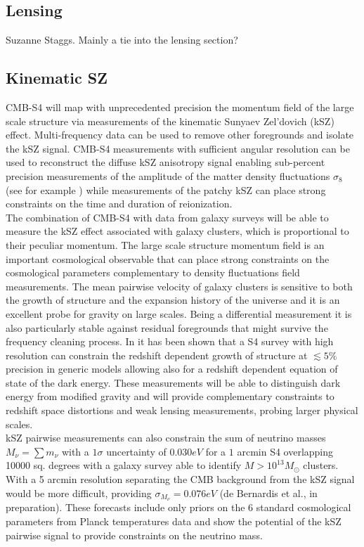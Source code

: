 \subsection{Lensing}

Suzanne Staggs.   Mainly a tie into the lensing section?

\subsection{Kinematic SZ}

CMB-S4 will map with unprecedented precision the momentum field of the large scale structure via measurements of the kinematic Sunyaev Zel'dovich (kSZ) effect. Multi-frequency data can be used to remove other foregrounds and isolate the kSZ signal. CMB-S4 measurements with sufficient angular resolution can be used to reconstruct the diffuse kSZ anisotropy signal enabling sub-percent precision measurements of the amplitude of the matter density fluctuations $\sigma_8$ (see for example \cite{Calabrese:2014gwa}) while measurements of the patchy kSZ can place strong constraints on the time and duration of reionization.\\
The combination of CMB-S4 with data from galaxy surveys will be able to measure the kSZ effect associated with galaxy clusters, which is proportional to their peculiar momentum. The large scale structure momentum field is an important cosmological observable that can place strong constraints on the cosmological parameters \cite{Bhattacharya:2007sk,Kosowsky:2009nc,Mueller:2014nsa,Mueller:2014dba} complementary to density fluctuations field measurements. The mean pairwise velocity of galaxy clusters is sensitive to both the growth of structure and the expansion history of the universe and it is an excellent probe for gravity on large scales. Being a differential measurement it is also particularly stable against residual foregrounds that might survive the frequency cleaning process. In \cite{Mueller:2014nsa,Mueller:2014dba} it has been shown that a S4 survey with high resolution can constrain the redshift dependent growth of structure at $\lesssim 5\%$ precision in generic models allowing also for a redshift dependent equation of state of the dark energy. These measurements will be able to distinguish dark energy from modified gravity and will provide complementary constraints to redshift space distortions and weak lensing measurements, probing larger physical scales.\\kSZ pairwise measurements can also constrain the sum of neutrino masses $M_{\nu}= \sum m_{\nu}$ with a $1\sigma$ uncertainty of $0.030 eV$ for a $1$ arcmin S4 overlapping 10000 sq. degrees with a galaxy survey able to identify $M>10^{13}M_{\odot}$ clusters. With a 5 arcmin resolution separating the CMB background from the kSZ signal would be more difficult, providing  $\sigma_{M_{\nu}} = 0.076 eV$ (de Bernardis et al., in preparation). These forecasts include only priors on the 6 standard cosmological parameters from Planck temperatures data and show the potential of the kSZ pairwise signal to provide constraints on the neutrino mass. 


